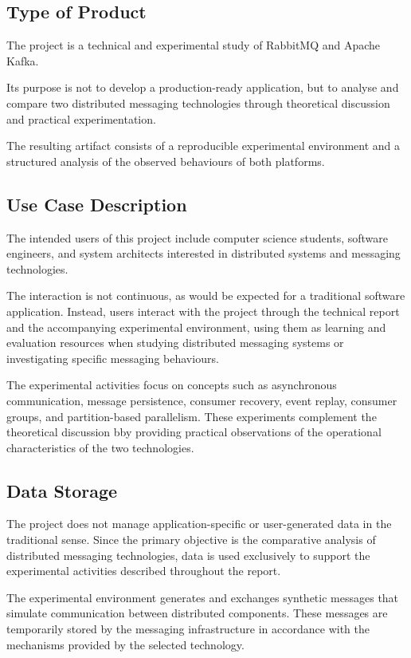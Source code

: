 \documentclass{scrartcl}
\begin{document}
\subsection{Type of Product}

The project is a technical and experimental study of RabbitMQ and Apache Kafka.

Its purpose is not to develop a production-ready application, but to analyse and compare two distributed messaging technologies through theoretical discussion and practical experimentation.

The resulting artifact consists of a reproducible experimental environment and a structured analysis of the observed behaviours of both platforms.

\subsection{Use Case Description}

The intended users of this project include computer science students, software engineers, and system architects interested in distributed systems and messaging technologies.

The interaction is not continuous, as would be expected for a traditional software application. Instead, users interact with the project through the technical report and the accompanying experimental environment, using them as learning and evaluation resources when studying distributed messaging systems or investigating specific messaging behaviours.

The experimental activities focus on concepts such as asynchronous communication, message persistence, consumer recovery, event replay, consumer groups, and partition-based parallelism. These experiments complement the theoretical discussion bby providing practical observations of the operational characteristics of the two
technologies.

\subsection{Data Storage}

The project does not manage application-specific or user-generated data in the traditional sense. Since the primary objective is the comparative analysis of distributed messaging technologies, data is used exclusively to support the experimental activities described throughout the report.

The experimental environment generates and exchanges synthetic messages that simulate communication between distributed components. These messages are temporarily stored by the messaging infrastructure in accordance with the mechanisms provided by the selected technology.
\end{document}

